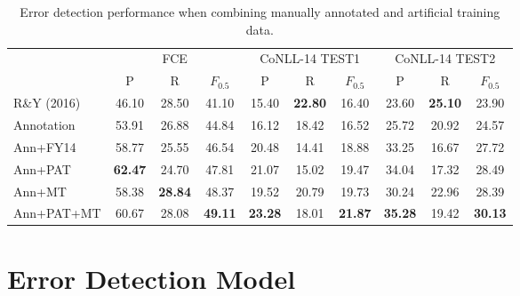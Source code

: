 \documentclass[11pt,letterpaper]{article}
\begin{document}
\begin{table}[t]
\setlength\tabcolsep{8pt}
\begin{tabular}{l|ccc|ccc|ccc} \hline
 & \multicolumn{3}{c|}{FCE} & \multicolumn{3}{c|}{CoNLL-14 TEST1} & \multicolumn{3}{c}{CoNLL-14 TEST2} \\ 
 & {\small P} & {\small R} & {\small $F_{0.5}$} & {\small P} & {\small R} & {\small $F_{0.5}$} & {\small P} & {\small R} & {\small $F_{0.5}$} \\\hline
R\&Y (2016) & 46.10 & 28.50 & 41.10 & 15.40 & \textbf{22.80} & 16.40 & 23.60 & \textbf{25.10} & 23.90\\ \hline
Annotation & 53.91 & 26.88 & 44.84 & 16.12 & 18.42 & 16.52 & 25.72 & 20.92 & 24.57\\
Ann+FY14 & 58.77 & 25.55 & 46.54 & 20.48 & 14.41 & 18.88 & 33.25 & 16.67 & 27.72\\
Ann+PAT & \textbf{62.47} & 24.70 & 47.81 & 21.07 & 15.02 & 19.47 & 34.04 & 17.32 & 28.49\\
Ann+MT & 58.38 & \textbf{28.84} & 48.37 & 19.52 & 20.79 & 19.73 & 30.24 & 22.96 & 28.39\\
Ann+PAT+MT & 60.67 & 28.08 & \textbf{49.11} & \textbf{23.28} & 18.01 & \textbf{21.87} & \textbf{35.28} & 19.42 & \textbf{30.13} \\ \hline
\end{tabular}
\caption{Error detection performance when combining manually annotated and artificial training data.}
\label{tab:add}
\end{table}







\section{Error Detection Model}
\label{sec:model}
\end{document}
